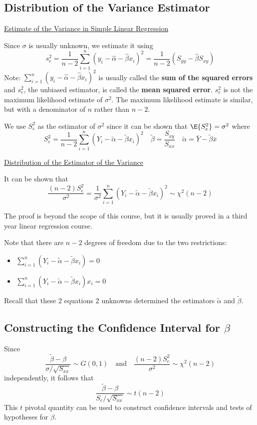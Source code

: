 \documentclass[oneside]{book}
\begin{document}
\subsection{Distribution of the Variance Estimator}
\underline{Estimate of the Variance in Simple Linear Regression}

Since $ \sigma $ is usually unknown, we estimate it using
\[s_{e}^{2}=\frac{1}{n-2} \sum_{i=1}^{n}\left(y_{i}-\hat{\alpha}-\hat{\beta} x_{i}\right)^{2}
    =\frac{1}{n-2}\left(S_{y y}-\hat{\beta} S_{x y}\right)\]
Note: $\sum\limits_{i=1}^{n}\left(y_{i}-\hat{\alpha}-\hat{\beta} x_{i}\right)^{2}$ is usually called the
\textbf{sum of the squared errors} and $ s_e^2 $, the unbiased estimator,
is called the \textbf{mean squared error}. $ s_e^2 $ is not the maximum likelihood estimate of
$ \sigma^2 $. The maximum likelihood estimate is similar, but with a denominator of $ n $
rather than $ n-2 $.

We use $ S_e^2 $ as the estimator of $ \sigma^2 $ since it can be shown that
$ \E{S_e^2}=\sigma^2 $ where
\[ S_{e}^{2}=\frac{1}{n-2} \sum_{i=1}^{n}\left(Y_{i}-\tilde{\alpha}-\tilde{\beta} x_{i}\right)^{2}
    \quad \tilde{\beta}=\frac{S_{x y}}{S_{x x}}
    \quad \tilde{\alpha}=\bar{Y}-\tilde{\beta} \bar{x} \]

\underline{Distribution of the Estimator of the Variance}

It can be shown that
\[ \frac{(n-2) S_{e}^{2}}{\sigma^{2}}
    =\frac{1}{\sigma^{2}} \sum_{i=1}^{n}\left(Y_{i}-\tilde{\alpha}-\tilde{\beta} x_{i}\right)^{2}
    \sim \chi^{2}(n-2) \]

The proof is beyond the scope of this course, but it is usually proved in a third year linear
regression course.

Note that there are $ n-2 $ degrees of freedom due to the two restrictions:
\begin{itemize}
    \item $\sum\limits_{i=1}^{n}\left(Y_{i}-\tilde{\alpha}-\tilde{\beta} x_{i}\right)=0$
    \item $\sum\limits_{i=1}^{n}\left(Y_{i}-\tilde{\alpha}-\tilde{\beta} x_{i}\right) x_{i}=0$
\end{itemize}
Recall that these $ 2 $ equations $ 2 $ unknowns determined the estimators
$ \tilde{\alpha} $ and $ \tilde{\beta} $.

\subsection{Constructing the Confidence Interval for $ \beta $}
Since
\[\frac{\tilde{\beta}-\beta}{\sigma / \sqrt{S_{x x}}} \sim G(0,1) \quad \text{and}
    \quad \frac{(n-2) S_{e}^{2}}{\sigma^{2}} \sim \chi^{2}(n-2)\]
independently, it follows that
\[ \frac{\tilde{\beta}-\beta}{S_e / \sqrt{S_{x x}}} \sim t(n-2)\]
This $ t $ pivotal quantity can be used to construct confidence intervals
and tests of hypotheses for $ \beta $.
\end{document}

